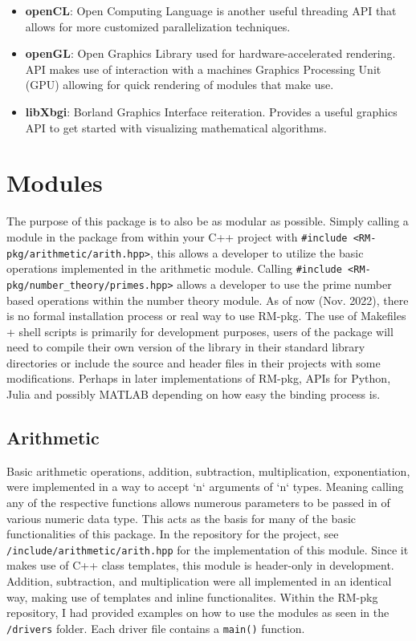 \documentclass[12pt, letterpaper]{article}
\begin{document}
\begin{sloppypar}
\begin{flushleft}
\begin{itemize}
\item \textbf{openCL}: Open Computing Language is another useful threading API that allows for
more customized parallelization techniques. 

\item \textbf{openGL}: Open Graphics Library used for hardware-accelerated rendering. API
makes use of interaction with a machines Graphics Processing Unit (GPU) allowing for quick
rendering of modules that make use.

\item \textbf{libXbgi}: Borland Graphics Interface reiteration. Provides a useful graphics API
to get started with visualizing mathematical algorithms.

\end{itemize}


\section{Modules}
The purpose of this package is to also be as modular as possible. Simply calling a module in 
the package from within your C++ project with \verb|#include <RM-pkg/arithmetic/arith.hpp>|, 
this allows a developer to utilize the basic operations implemented in the arithmetic module.
Calling \verb|#include <RM-pkg/number_theory/primes.hpp>| allows a developer to use the 
prime number based operations within the number theory module. \linebreak
As of now (Nov. 2022), there is no formal installation process or real way to use RM-pkg.
The use of Makefiles + shell scripts is primarily for development purposes, users of the 
package will need to compile their own version of the library in their standard
library directories or include the source and header files in their projects with some 
modifications. \linebreak
Perhaps in later implementations of RM-pkg, APIs for Python, Julia and possibly MATLAB 
depending on how easy the binding process is. 

\subsection{Arithmetic}
Basic arithmetic operations, addition, subtraction, multiplication, exponentiation, were 
implemented in a way to accept `n` arguments of `n` types. Meaning calling any of the 
respective functions allows numerous parameters to be passed in of various numeric data type. 
This acts as the basis for many of the basic functionalities of this package.
In the repository for the project, see \verb|/include/arithmetic/arith.hpp| for the 
implementation of this module. Since it makes use of C++ class templates, this module is 
header-only in development. Addition, subtraction, and multiplication were all implemented 
in an identical way, making use of templates and inline functionalites. Within the RM-pkg 
repository, I had provided examples on how to use the modules as seen in the 
\verb|/drivers| folder. Each driver file contains a \verb|main()| function.


\end{flushleft}
\end{sloppypar}
\end{document}
